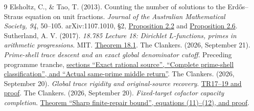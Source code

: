 {\small
\begin{thebibliography}{9}
\setlength{\itemsep}{0pt}
 Elsholtz, C., \& Tao, T. (2013). Counting the number of solutions to
 the Erd\H{o}s--Straus equation on unit fractions. \emph{Journal of the Australian
 Mathematical Society, 94}, 50--105. arXiv:1107.1010, \S2,
 \href{https://arxiv.org/pdf/1107.1010\#page=12}{Proposition 2.2} and
 \href{https://arxiv.org/pdf/1107.1010\#page=14}{Proposition 2.6}.
 Sutherland, A. V. (2017). \emph{18.785 Lecture 18: Dirichlet
 $L$-functions, primes in arithmetic progressions}. MIT.
 \href{https://math.mit.edu/classes/18.785/2017fa/LectureNotes18.pdf\#page=1}{Theorem 18.1}.
 The Clankers. (2026, September 21). \emph{Prime-shell trace
 descent and an exact global denominator cutoff}. Preceding programme tranche,
 \href{https://github.com/KokunoYumeto/erdos-straus-foundation/blob/1400e6301429cf9c66d8071e107be9dc41f5b907/research/incoming/es-turn07-divisor-descent-20260921/antecedent/prime_shell_trace.md\#L7-L75}{sections ``Exact rational source'', ``Complete prime-shell classification'', and ``Actual same-prime middle return''}.
 The Clankers. (2026, September 20). \emph{Global trace rigidity
 and original-source recovery}.
 \href{https://github.com/KokunoYumeto/erdos-straus-foundation/blob/49976b17491ba927df8bc7f2c2f81d39dfb15ce8/research/incoming/es-turn07-trace-rigidity-20260920/core.tex\#L339-L377}{TR17--19 and proof}.
 The Clankers. (2026, September 20). \emph{Fixed-target cofactor
 capacity completion}.
 \href{https://github.com/KokunoYumeto/erdos-straus-foundation/blob/49976b17491ba927df8bc7f2c2f81d39dfb15ce8/research/incoming/es-turn07-capacity-completion-20260920/core.tex\#L167-L191}{Theorem ``Sharp finite-repair bound'', equations (11)--(12), and proof}.
\end{thebibliography}
}
